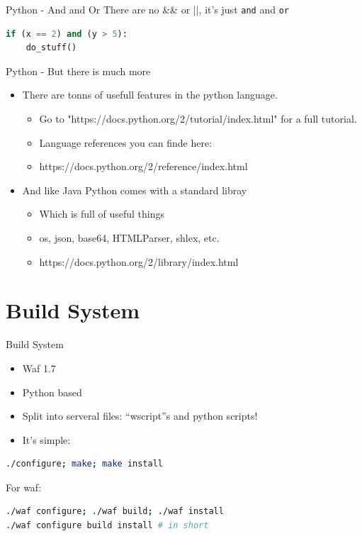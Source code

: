 \documentclass[fleqn,11pt,aspectratio=43]{beamer}
\begin{document}
\begin{frame}[fragile]{Python - And and Or}
  There are no \&\& or ||, it's just {\tt and} and {\tt or}
\begin{lstlisting}[language=python]
if (x == 2) and (y > 5):
    do_stuff()
\end{lstlisting}
\end{frame}

\begin{frame}[fragile]{Python - But there is much more}
  \begin{itemize}
    \item There are tonns of usefull features in the python language.
    \begin{itemize}
      \item Go to "https://docs.python.org/2/tutorial/index.html" for a full tutorial.
      \item Language references you can finde here:
      \item https://docs.python.org/2/reference/index.html
    \end{itemize}
    \item And like Java Python comes with a standard libray
    \begin{itemize}
      \item Which is full of useful things
      \item os, json, base64, HTMLParser, shlex, etc.
      \item https://docs.python.org/2/library/index.html
    \end{itemize}
  \end{itemize}
\end{frame}

\section{Build System}

\begin{frame}[fragile]{Build System}
  \begin{itemize}
    \item Waf 1.7
    \item Python based
    \item Split into serveral files: “wscript”s and python scripts!
    \item It’s simple: 
  \end{itemize}
\begin{lstlisting}[language=bash]
./configure; make; make install
\end{lstlisting}
For waf: 
\begin{lstlisting}[language=bash]
./waf configure; ./waf build; ./waf install
./waf configure build install # in short
\end{lstlisting}
\end{frame}
\end{document}
